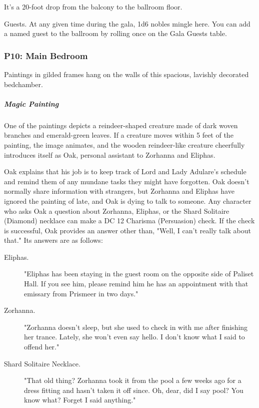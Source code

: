 \documentclass[10pt,a4paper,twoside,bg=print,twocolumn,openany,nodeprecatedcode]{dndbook}
\begin{document}
It's a 20-foot drop from the balcony to the ballroom floor.

Guests. At any given time during the gala, 1d6 nobles mingle here. You can add a named guest to the ballroom by rolling once on the Gala Guests table.

\subsubsection{P10: Main Bedroom}
\begin{DndReadAloud}{}
Paintings in gilded frames hang on the walls of this spacious, lavishly decorated bedchamber.

\end{DndReadAloud}

\subparagraph{Magic Painting}
One of the paintings depicts a reindeer-shaped creature made of dark woven branches and emerald-green leaves. If a creature moves within 5 feet of the painting, the image animates, and the wooden reindeer-like creature cheerfully introduces itself as Oak, personal assistant to Zorhanna and Eliphas.

Oak explains that his job is to keep track of Lord and Lady Adulare's schedule and remind them of any mundane tasks they might have forgotten. Oak doesn't normally share information with strangers, but Zorhanna and Eliphas have ignored the painting of late, and Oak is dying to talk to someone. Any character who asks Oak a question about Zorhanna, Eliphas, or the Shard Solitaire (Diamond) necklace can make a DC 12 Charisma (Persuasion) check. If the check is successful, Oak provides an answer other than, "Well, I can't really talk about that." Its answers are as follows:


\begin{description}
\item[Eliphas.]
"Eliphas has been staying in the guest room on the opposite side of Paliset Hall. If you see him, please remind him he has an appointment with that emissary from Prismeer in two days."
\item[Zorhanna.]
"Zorhanna doesn't sleep, but she used to check in with me after finishing her trance. Lately, she won't even say hello. I don't know what I said to offend her."
\item[Shard Solitaire Necklace.]
"That old thing? Zorhanna took it from the pool a few weeks ago for a dress fitting and hasn't taken it off since. Oh, dear, did I say pool? You know what? Forget I said anything."
\end{description}
\end{document}
